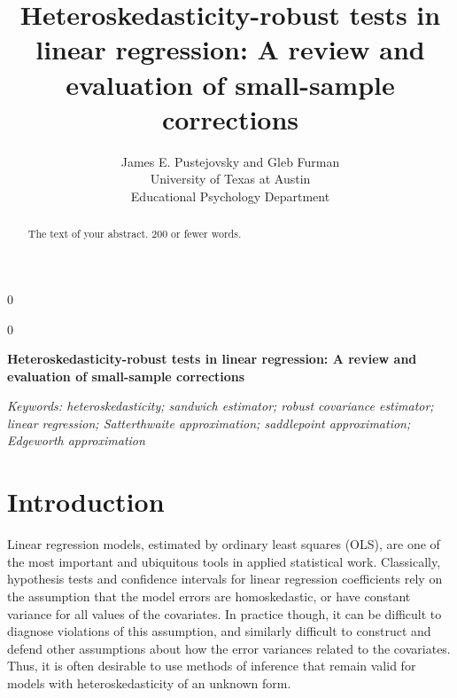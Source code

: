 \documentclass[12pt]{article}\usepackage[]{graphicx}\usepackage[]{color}
\newcommand{\blind}{0}
\newcommand{\MyTitle}{Heteroskedasticity-robust tests in linear regression: A review and evaluation of small-sample corrections}
\begin{document}
%

\def\spacingset#1{\renewcommand{\baselinestretch}%
{#1}\small\normalsize} \spacingset{1}



\blind
{
  \title{\bf \MyTitle}
  \author{James E. Pustejovsky and Gleb Furman \\
    University of Texas at Austin \\
    Educational Psychology Department}
  \maketitle
} \fi

\blind
{
  \bigskip
  \bigskip
  \bigskip
  \begin{center}
    {\LARGE\bf \MyTitle}
\end{center}
  \medskip
} \fi

\bigskip
\begin{abstract}
The text of your abstract.  200 or fewer words.
\end{abstract}

\noindent%
{\it Keywords: heteroskedasticity; sandwich estimator; robust covariance estimator; linear regression; Satterthwaite approximation; saddlepoint approximation; Edgeworth approximation} 
\vfill

\newpage
\spacingset{1.45} %

\section{Introduction}
\label{sec:intro}

Linear regression models, estimated by ordinary least squares (OLS), are one of the most important and ubiquitous tools in applied statistical work.
Classically, hypothesis tests and confidence intervals for linear regression coefficients rely on the assumption that the model errors are homoskedastic, or have constant variance for all values of the covariates. 
In practice though, it can be difficult to diagnose violations of this assumption, and similarly difficult to construct and defend other assumptions about how the error variances related to the covariates. 
Thus, it is often desirable to use methods of inference that remain valid for models with heteroskedasticity of an unknown form. 
\end{document}

